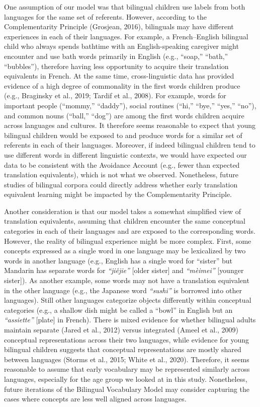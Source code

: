 \documentclass[
  english,
  ,man,floatsintext]{apa6}
\begin{document}
One assumption of our model was that bilingual children use labels from both languages for the same set of referents. However, according to the Complementarity Principle (Grosjean, 2016), bilinguals may have different experiences in each of their languages. For example, a French--English bilingual child who always spends bathtime with an English-speaking caregiver might encounter and use bath words primarily in English (e.g., ``soap,'' ``bath,'' ``bubbles''), therefore having less opportunity to acquire their translation equivalents in French. At the same time, cross-linguistic data has provided evidence of a high degree of commonality in the first words children produce (e.g., Braginsky et al., 2019; Tardif et al., 2008). For example, words for important people (``mommy,'' ``daddy''), social routines (``hi,'' ``bye,'' ``yes,'' ``no''), and common nouns (``ball,'' ``dog'') are among the first words children acquire across languages and cultures. It therefore seems reasonable to expect that young bilingual children would be exposed to and produce words for a similar set of referents in each of their languages. Moreover, if indeed bilingual children tend to use different words in different linguistic contexts, we would have expected our data to be consistent with the Avoidance Account (e.g., fewer than expected translation equivalents), which is not what we observed. Nonetheless, future studies of bilingual corpora could directly address whether early translation equivalent learning might be impacted by the Complementarity Principle.

Another consideration is that our model takes a somewhat simplified view of translation equivalents, assuming that children encounter the same conceptual categories in each of their languages and are exposed to the corresponding words. However, the reality of bilingual experience might be more complex. First, some concepts expressed as a single word in one language may be lexicalized by two words in another language (e.g., English has a single word for ``sister'' but Mandarin has separate words for \emph{``jiějie''} {[}older sister{]} and \emph{``mèimei''} {[}younger sister{]}). As another example, some words may not have a translation equivalent in the other language (e.g., the Japanese word \emph{``sushi''} is borrowed into other languages). Still other languages categorize objects differently within conceptual categories (e.g., a shallow dish might be called a ``bowl'' in English but an \emph{``assiette''} {[}plate{]} in French). There is mixed evidence for whether bilingual adults maintain separate (Jared et al., 2012) versus integrated (Ameel et al., 2009) conceptual representations across their two languages, while evidence for young bilingual children suggests that conceptual representations are mostly shared between languages (Storms et al., 2015; White et al., 2020). Therefore, it seems reasonable to assume that early vocabulary may be represented similarly across languages, especially for the age group we looked at in this study. Nonetheless, future iterations of the Bilingual Vocabulary Model may consider capturing the cases where concepts are less well aligned across languages.
\end{document}
